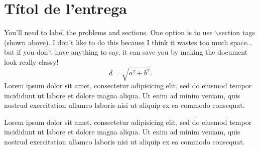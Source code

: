 \setcounter{section}{0}
\section{Títol de l'entrega} %
You'll need to label the problems and sections.  One option is to use $\backslash$section tags (shown above).  I don't like to do this because I think it wastes too much space... but if you don't have anything to say, it can save you by making the document look really classy!
\begin{equation}
d = \sqrt{a^2+b^2}.
\end{equation}
Lorem ipsum dolor sit amet, consectetur adipisicing elit, sed do eiusmod tempor incididunt ut labore et dolore magna aliqua. Ut enim ad minim veniam, quis nostrud exercitation ullamco laboris nisi ut aliquip ex ea commodo consequat.

Lorem ipsum dolor sit amet, consectetur adipisicing elit, sed do eiusmod tempor incididunt ut labore et dolore magna aliqua. Ut enim ad minim veniam, quis nostrud exercitation ullamco laboris nisi ut aliquip ex ea commodo consequat.
